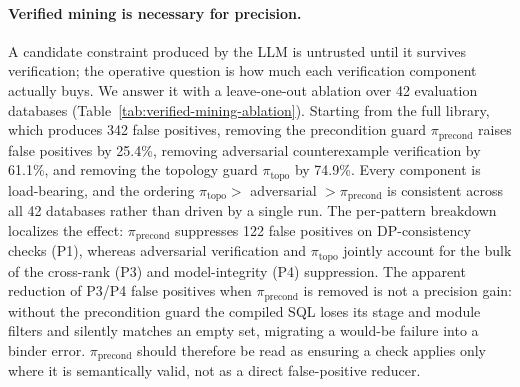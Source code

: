 \paragraph{Verified mining is necessary for precision.}
A candidate constraint produced by the LLM is untrusted until it survives verification; the operative question is how much each verification component actually buys. We answer it with a leave-one-out ablation over 42 evaluation databases (Table~\ref{tab:verified-mining-ablation}). Starting from the full library, which produces 342 false positives, removing the precondition guard $\pi_{\text{precond}}$ raises false positives by 25.4\%, removing adversarial counterexample verification by 61.1\%, and removing the topology guard $\pi_{\text{topo}}$ by 74.9\%. Every component is load-bearing, and the ordering $\pi_{\text{topo}} >$ adversarial $> \pi_{\text{precond}}$ is consistent across all 42 databases rather than driven by a single run. The per-pattern breakdown localizes the effect: $\pi_{\text{precond}}$ suppresses 122 false positives on DP-consistency checks (P1), whereas adversarial verification and $\pi_{\text{topo}}$ jointly account for the bulk of the cross-rank (P3) and model-integrity (P4) suppression. The apparent reduction of P3/P4 false positives when $\pi_{\text{precond}}$ is removed is not a precision gain: without the precondition guard the compiled SQL loses its stage and module filters and silently matches an empty set, migrating a would-be failure into a binder error. $\pi_{\text{precond}}$ should therefore be read as ensuring a check applies only where it is semantically valid, not as a direct false-positive reducer.

%
